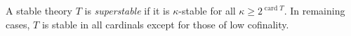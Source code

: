 A stable theory $T$ is \textit{superstable} if it is $\kappa$-stable for all $\kappa \geq 2^{\operatorname{card} T}$. In remaining cases, $T$ is stable in all cardinals except for those of low cofinality.
